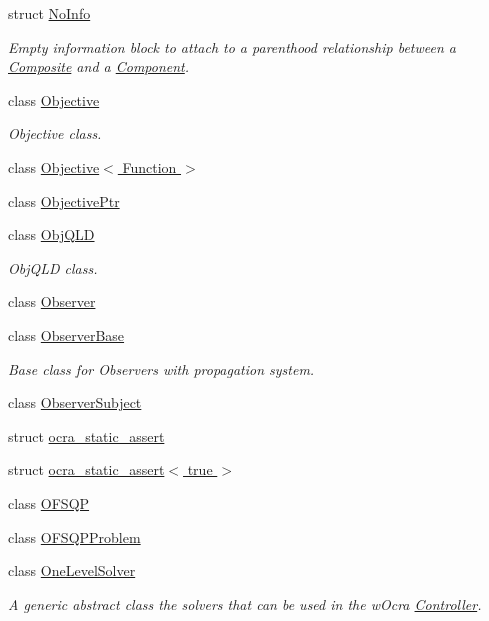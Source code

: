 \begin{DoxyCompactItemize}
struct \hyperlink{structocra_1_1NoInfo}{No\+Info}
\begin{DoxyCompactList}\small\item\em Empty information block to attach to a parenthood relationship between a \hyperlink{classocra_1_1Composite}{Composite} and a \hyperlink{classocra_1_1Component}{Component}. \end{DoxyCompactList}\item 
class \hyperlink{classocra_1_1Objective}{Objective}
\begin{DoxyCompactList}\small\item\em Objective class. \end{DoxyCompactList}\item 
class \hyperlink{classocra_1_1Objective_3_01Function_01_4}{Objective$<$ Function $>$}
\item 
class \hyperlink{classocra_1_1ObjectivePtr}{Objective\+Ptr}
\item 
class \hyperlink{classocra_1_1ObjQLD}{Obj\+Q\+LD}
\begin{DoxyCompactList}\small\item\em Obj\+Q\+LD class. \end{DoxyCompactList}\item 
class \hyperlink{classocra_1_1Observer}{Observer}
\item 
class \hyperlink{classocra_1_1ObserverBase}{Observer\+Base}
\begin{DoxyCompactList}\small\item\em Base class for Observers with propagation system. \end{DoxyCompactList}\item 
class \hyperlink{classocra_1_1ObserverSubject}{Observer\+Subject}
\item 
struct \hyperlink{structocra_1_1ocra__static__assert}{ocra\+\_\+static\+\_\+assert}
\item 
struct \hyperlink{structocra_1_1ocra__static__assert_3_01true_01_4}{ocra\+\_\+static\+\_\+assert$<$ true $>$}
\item 
class \hyperlink{classocra_1_1OFSQP}{O\+F\+S\+QP}
\item 
class \hyperlink{classocra_1_1OFSQPProblem}{O\+F\+S\+Q\+P\+Problem}
\item 
class \hyperlink{classocra_1_1OneLevelSolver}{One\+Level\+Solver}
\begin{DoxyCompactList}\small\item\em A generic abstract class the solvers that can be used in the w\+Ocra \hyperlink{classocra_1_1Controller}{Controller}. \end{DoxyCompactList}\item 

\end{DoxyCompactItemize}
